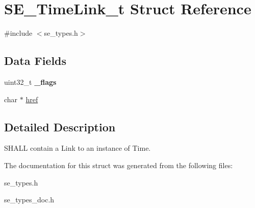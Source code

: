 \hypertarget{structSE__TimeLink__t}{}\section{S\+E\+\_\+\+Time\+Link\+\_\+t Struct Reference}
\label{structSE__TimeLink__t}


{\ttfamily \#include $<$se\+\_\+types.\+h$>$}

\subsection*{Data Fields}
\begin{DoxyCompactItemize}
\item 
uint32\+\_\+t {\bfseries \+\_\+flags}
\item 
char $\ast$ \hyperlink{group__TimeLink_gaa8fa6f46d64d627ca794b3ef3e509a25}{href}
\end{DoxyCompactItemize}


\subsection{Detailed Description}
S\+H\+A\+LL contain a Link to an instance of Time. 

The documentation for this struct was generated from the following files\+:\begin{DoxyCompactItemize}
\item 
se\+\_\+types.\+h\item 
se\+\_\+types\+\_\+doc.\+h\end{DoxyCompactItemize}
